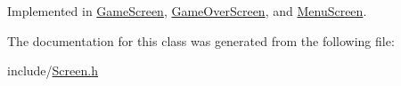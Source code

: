 Implemented in \hyperlink{class_game_screen_a0e39ba2968e5fcec952119f7a9d6e437}{Game\+Screen}, \hyperlink{class_game_over_screen_aff38f34b95835895e285c735c5c9f3c7}{Game\+Over\+Screen}, and \hyperlink{class_menu_screen_ad6e00debf1d2ddcaa716327598590cf5}{Menu\+Screen}.



The documentation for this class was generated from the following file\+:\begin{DoxyCompactItemize}
\item 
include/\hyperlink{_screen_8h}{Screen.\+h}\end{DoxyCompactItemize}

